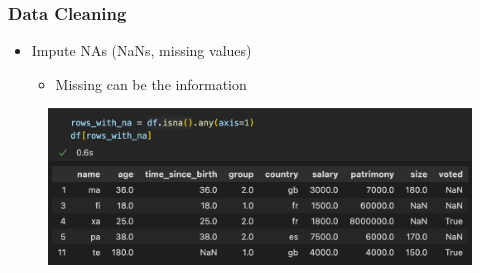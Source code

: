 \begin{frame}\frametitle{Data Cleaning}
   \begin{itemize}
      \item Impute NAs (NaNs, missing values)
      \begin{itemize}
         \item Missing can be the information
      \end{itemize}
   \end{itemize}
   \vspace{.5cm}
   \begin{minipage}{0.58\linewidth}
      \begin{figure}[H]
         \includegraphics[scale=.35]{../images/illustrations/data_cleaning_na_imputation_info_1.png}
      \end{figure}
   \end{minipage}


\end{frame}
